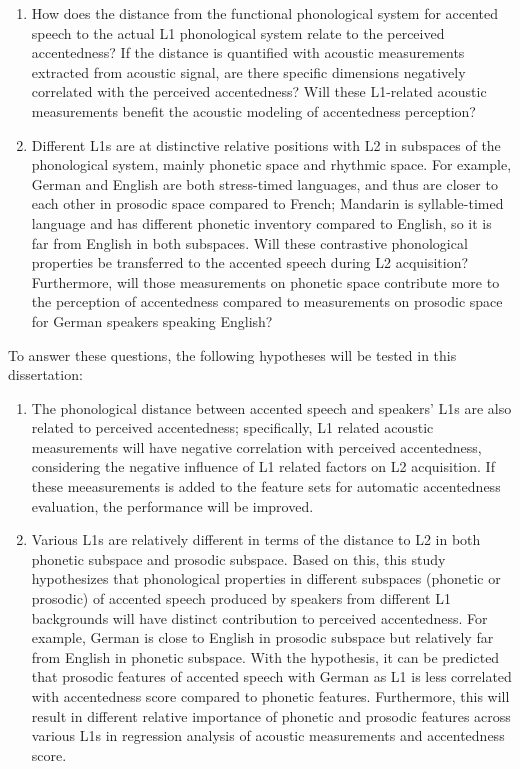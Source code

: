 \begin{enumerate}
\item How does the distance from the functional phonological system for accented speech to the actual L1 phonological system relate to the perceived accentedness?  If the distance is quantified with acoustic measurements extracted from acoustic signal, are there specific dimensions negatively correlated with the perceived accentedness?
    Will these L1-related acoustic measurements benefit the acoustic modeling of accentedness perception?
\item Different L1s are at distinctive relative positions with L2 in subspaces of the phonological system, mainly phonetic space and rhythmic space. For example, German and English are both stress-timed languages, and thus are closer to each other in prosodic space compared to French; Mandarin is syllable-timed language and has different phonetic inventory compared to English, so it is far from English in both subspaces. Will these contrastive phonological properties be transferred to the accented speech during L2 acquisition? Furthermore, will those measurements on phonetic space contribute more to the perception of accentedness compared to measurements on prosodic space for German speakers speaking English?
\end{enumerate}

To answer these questions, the following hypotheses will be tested in this dissertation:
\begin{enumerate}
\item The phonological distance between accented speech and speakers' L1s are also related to perceived accentedness; specifically, L1 related acoustic measurements will have negative correlation with perceived accentedness, considering the negative influence of L1 related factors on L2 acquisition. If these meeasurements is added to the feature sets for automatic accentedness evaluation, the performance will be improved.
\item Various L1s are relatively different in terms of the distance to L2 in both phonetic subspace and prosodic subspace. Based on this, this study hypothesizes that phonological properties in different subspaces (phonetic or prosodic) of accented speech produced by speakers from different L1 backgrounds will have distinct contribution to perceived accentedness. For example, German is close to English in prosodic subspace but relatively far from English in phonetic subspace. With the hypothesis, it can be predicted that prosodic features of accented speech with German as L1 is less correlated with accentedness score compared to phonetic features. Furthermore, this will result in different relative importance of phonetic and prosodic features across various L1s in regression analysis of acoustic measurements and accentedness score.
\end{enumerate}

